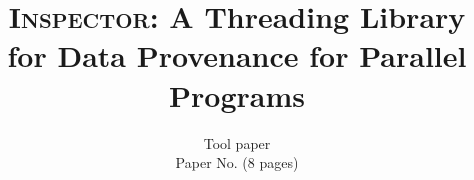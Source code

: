 \documentclass{IEEEtran}
\newcommand{\projecttitle}{\textsc{Inspector}\xspace}
\begin{document}
\author{
Tool paper\\
Paper No. (8 pages)
}
\title{\Large \projecttitle: A Threading Library for Data Provenance for Parallel Programs}
\maketitle




%









 
\end{document}
